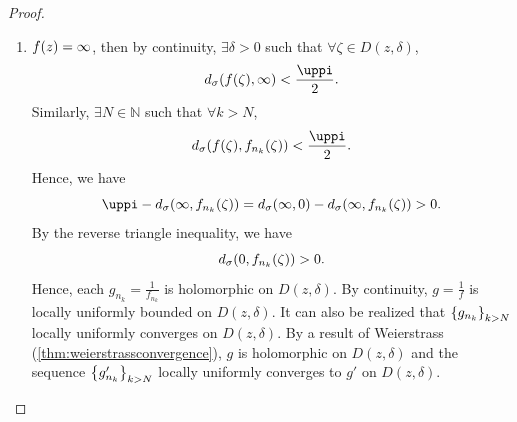 \begin{proof}
\begin{enumerate}
            By holomorphy of \(f'\) on \(\overline{D\qty(z,\frac\delta2)}\), \(\exists M'>0\) such that \(\sup_{\zeta\in\overline{D\qty(z,\frac\delta2)}}\abs{f'(\zeta)}<M'\). Uniform convergence of \(\cbraces{f'_{n_k}}_{k>N}\) gives the existence of some \(N'>N\) such that \(\forall k>N'\), \[\abs{f'_{n_k}(\zeta)-f'(\zeta)}<1\implies\abs{f'_{n_k}(\zeta)}\leq M'+1\qquad\forall\zeta\in\overline{D\qty(z,\frac\delta2)}.\] Therefore, \(\cbraces{f'_{n_k}}_{k>N}\) is uniformly bounded by \[M=\max\qty(\cbraces{M'+1}\cup\cbraces{\sup_{\zeta\in\overline{D\qty(z,\frac\delta2)}}\abs{f_{n_k}'(\zeta)}}_{N<k\leq N'})\] on this compact disk. Hence, \(\forall k>N\), \[f^\sharp_{n_k}(\zeta)=\frac{2\abs{f_{n_k}'(\zeta)}}{1+\abs{f_{n_k}(\zeta)}^2}\leq 2\abs{f'_{n_k}(\zeta)}\leq 2M\qquad\forall\zeta\in D\qty(z,\frac\delta2)\subset\overline{D\qty(z,\frac\delta2)}.\]
        \item \(f\qty(z)=\infty\), then by continuity, \(\exists\delta>0\) such that \(\forall\zeta\in D(z,\delta)\), \[d_\sigma\qty(f(\zeta),\infty)<\frac\uppi2.\] Similarly, \(\exists N\in\mathbb{N}\) such that \(\forall k>N\), \[d_\sigma\qty(f(\zeta),f_{n_k}(\zeta))<\frac\uppi2.\]
            Hence, we have \[\uppi-d_\sigma\qty(\infty,f_{n_k}(\zeta))=d_\sigma(\infty,0)-d_\sigma\qty(\infty,f_{n_k}(\zeta))>0.\] By the reverse triangle inequality, we have \[d_\sigma\qty(0,f_{n_k}(\zeta))>0.\]
            Hence, each \(g_{n_k}=\frac1{f_{n_k}}\) is holomorphic on \(D(z,\delta)\). By continuity, \(g=\frac1f\) is locally uniformly bounded on \(D(z,\delta)\). It can also be realized that \(\cbraces{g_{n_k}}_{k>N}\) locally uniformly converges on \(D(z,\delta)\). By a result of Weierstrass (\cref{thm:weierstrassconvergence}), \(g\) is holomorphic on \(D(z,\delta)\) and the sequence \(\cbraces{g_{n_k}'}_{k>N}\) locally uniformly converges to \(g'\) on \(D(z,\delta)\).


\end{enumerate}
\end{proof}
